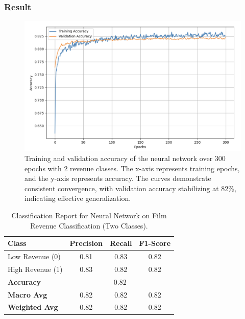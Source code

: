 \documentclass{article}
\begin{document}
\subsubsection{Result}
\begin{figure}[H] %
    \centering
    \vspace{0.3cm} %
    \includegraphics[width=1.0\linewidth]{nn_accuracy.png} %
    \caption{Training and validation accuracy of the neural network over 300 epochs with 2 revenue classes. The x-axis represents training epochs, and the y-axis represents accuracy. The curves demonstrate consistent convergence, with validation accuracy stabilizing at 82\%, indicating effective generalization.}
    \label{fig:training_validation_accuracy}
\end{figure}

\begin{table}[H]
    \centering
    \small %
    \caption{Classification Report for Neural Network on Film Revenue Classification (Two Classes).}
    \label{tab:classification_report}
    \vspace{0.1in} %
    \begin{tabular}{lccc}
        \toprule
        \textbf{Class} & \textbf{Precision} & \textbf{Recall} & \textbf{F1-Score} \\
        \midrule
        Low Revenue (0)  & 0.81 & 0.83 & 0.82 \\
        High Revenue (1) & 0.83 & 0.82 & 0.82 \\
        \midrule
        \textbf{Accuracy}  & \multicolumn{3}{c}{0.82} \\
        \textbf{Macro Avg} & 0.82 & 0.82 & 0.82 \\
        \textbf{Weighted Avg} & 0.82 & 0.82 & 0.82 \\
        \bottomrule
    \end{tabular}
    \vspace{0.1in} %
\end{table}
\end{document}
